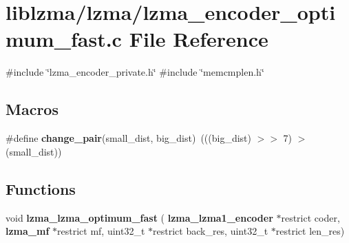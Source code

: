 \section{liblzma/lzma/lzma\+\_\+encoder\+\_\+optimum\+\_\+fast.c File Reference}
\label{lzma__encoder__optimum__fast_8c}
{\ttfamily \#include \char`\"{}lzma\+\_\+encoder\+\_\+private.\+h\char`\"{}}\newline
{\ttfamily \#include \char`\"{}memcmplen.\+h\char`\"{}}\newline
\subsection*{Macros}
\begin{DoxyCompactItemize}
\item 
\mbox{\label{lzma__encoder__optimum__fast_8c_a6c81740f4cb07ddc494a3daffeb1ab54}} 
\#define {\bfseries change\+\_\+pair}(small\+\_\+dist,  big\+\_\+dist)~(((big\+\_\+dist) $>$$>$ 7) $>$ (small\+\_\+dist))
\end{DoxyCompactItemize}
\subsection*{Functions}
\begin{DoxyCompactItemize}
\item 
\mbox{\label{lzma__encoder__optimum__fast_8c_a98a5417f4d43aad0775c0a665dabb294}} 
void {\bfseries lzma\+\_\+lzma\+\_\+optimum\+\_\+fast} (\textbf{ lzma\+\_\+lzma1\+\_\+encoder} $\ast$restrict coder, \textbf{ lzma\+\_\+mf} $\ast$restrict mf, uint32\+\_\+t $\ast$restrict back\+\_\+res, uint32\+\_\+t $\ast$restrict len\+\_\+res)
\end{DoxyCompactItemize}
